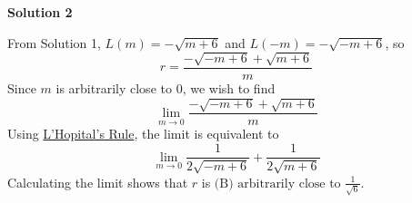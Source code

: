 \begin{enumerate}
 



\textbf{Solution 2}

From Solution 1, $L(m) = -\sqrt{m+6}$ and $L(-m) = -\sqrt{-m+6}$, so
 \[r = \frac{-\sqrt{-m+6}+\sqrt{m+6}}{m}\]Since $m$ is arbitrarily close to $0$, we wish to find
 \[\lim_{m \rightarrow 0} \frac{-\sqrt{-m + 6} + \sqrt{m + 6}}{m}\]Using \href{https://artofproblemsolving.com/wiki/index.php?title=L\%27Hopital\%27s\_Rule}{L'Hopital's Rule}, the limit is equivalent to
 \[\lim_{m \rightarrow 0} \frac{1}{2 \sqrt{-m + 6}} + \frac{1}{2 \sqrt{m + 6}}\]Calculating the limit shows that $r$ is $\boxed{\text{(B) arbitrarily close to }\frac{1}{\sqrt{6}}}$.

 


\end{enumerate}